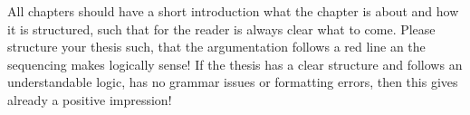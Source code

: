 All chapters should have a short introduction what the chapter is about and how it is structured, such that for the reader is always clear what to come. Please structure your thesis such, that the argumentation follows a red line an the sequencing makes logically sense! If the thesis has a clear structure and follows an understandable logic, has no grammar issues or formatting errors, then this gives already a positive impression! 